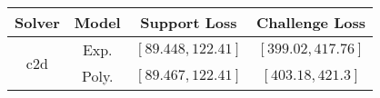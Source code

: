 \begin{tabular}{cc|c|c} 
\hline 
 Solver & Model & Support Loss  & Challenge Loss \tabularnewline\hline 
\hline 
\multirow{2}{*}{c2d} & Exp. & $\left[89.448,122.41\right]$ & $\left[399.02,417.76\right]$ \tabularnewline 
 & Poly. & $\left[89.467,122.41\right]$ & $\left[403.18,421.3\right]$ \tabularnewline 
\hline 
\end{tabular} 

